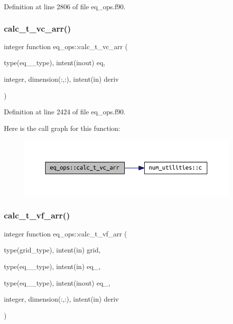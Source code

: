 Definition at line 2806 of file eq\+\_\+ops.\+f90.

\mbox{\label{namespaceeq__ops_acd0be2e627748f6387bb38ee0ad7c906}} 
\subsubsection{\texorpdfstring{calc\+\_\+t\+\_\+vc\+\_\+arr()}{calc\_t\_vc\_arr()}}
{\footnotesize\ttfamily integer function eq\+\_\+ops\+::calc\+\_\+t\+\_\+vc\+\_\+arr (\begin{DoxyParamCaption}\item[{type(eq\+\_\+2\+\_\+type), intent(inout)}]{eq,  }\item[{integer, dimension(\+:,\+:), intent(in)}]{deriv }\end{DoxyParamCaption})}



Definition at line 2424 of file eq\+\_\+ops.\+f90.

Here is the call graph for this function\+:
\nopagebreak
\begin{figure}[H]
\begin{center}
\leavevmode
\includegraphics[width=350pt]{namespaceeq__ops_acd0be2e627748f6387bb38ee0ad7c906_cgraph}
\end{center}
\end{figure}
\mbox{\label{namespaceeq__ops_a9fe661ac183df2bdf7a96b4450be21aa}} 
\subsubsection{\texorpdfstring{calc\+\_\+t\+\_\+vf\+\_\+arr()}{calc\_t\_vf\_arr()}}
{\footnotesize\ttfamily integer function eq\+\_\+ops\+::calc\+\_\+t\+\_\+vf\+\_\+arr (\begin{DoxyParamCaption}\item[{type(grid\+\_\+type), intent(in)}]{grid,  }\item[{type(eq\+\_\+1\+\_\+type), intent(in)}]{eq\+\_,  }\item[{type(eq\+\_\+2\+\_\+type), intent(inout)}]{eq\+\_,  }\item[{integer, dimension(\+:,\+:), intent(in)}]{deriv }\end{DoxyParamCaption})}



